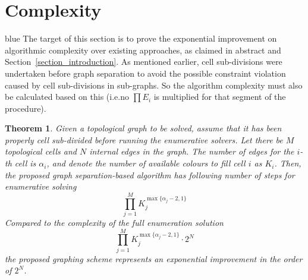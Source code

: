 \documentclass[journal]{IEEEtran}
\newtheorem*{theorem}{Theorem}
\begin{document}
\section{Complexity}
\label{section_complexity}
\begin{color}{blue}
The target of this section is to prove the exponential improvement on algorithmic complexity over existing approaches, as claimed in abstract and Section~\ref{section_introduction}. 
As mentioned earlier, cell sub-divisions were undertaken before graph separation to avoid the possible  constraint violation caused by cell sub-divisions in sub-graphs. So the algorithm complexity must also be calculated based on this (i.e.no $\prod E_i$ is multiplied for that segment of the procedure).

\begin{theorem}
Given a topological graph to be solved, assume that it has been properly cell sub-divided before running the enumerative solvers. Let there be $M$ topological cells and $N$ internal edges in the graph. The number of edges for the $i$-th cell is $\alpha_i$, and denote the number of available colours to fill cell $i$ as $K_i$. Then, the proposed graph separation-based algorithm has following number of steps for enumerative solving
\begin{equation}
\prod\limits_{j = 1}^M K_j^{\max\{\alpha_j-2, 1\}}
\end{equation}
Compared to the complexity of the full enumeration solution~\cite{Yang2020Cellular}
\begin{equation}
\prod\limits_{j = 1}^M K_j^{\max\{\alpha_j-2, 1\}}\cdot 2^N
\end{equation}
the proposed graphing scheme represents an exponential improvement in 
the order of $2^N$. 
\end{theorem}
\end{color}
\end{document}
